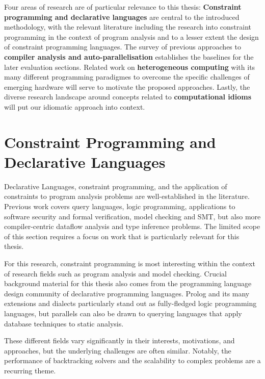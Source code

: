 
    Four areas of research are of particular relevance to this thesis:
    {\bf Constraint programming and declarative languages} are central to the
    introduced methodology, with the relevant literature including the research
    into constraint programming in the context of program analysis and to a
    lesser extent the design of constraint programming languages.
    The survey of previous approaches to
    {\bf compiler analysis and auto-parallelisation}
    establishes the baselines for the later evaluation sections.
    Related work on {\bf heterogeneous computing} with its many different
    programming paradigmes to overcome the specific challenges of emerging
    hardware will serve to motivate the proposed approaches.
    Lastly, the diverse research landscape around concepts related to
    {\bf computational idioms} will put our idiomatic approach into context.

\section{Constraint Programming and Declarative Languages}

    Declarative Languages, constraint programming, and the application of
    constraints to program analysis problems are well-established in the
    literature.
    Previous work covers query languages, logic programming, applications to
    software security and formal verification, model checking and SMT,
    but also more compiler-centric dataflow analysis and type inference
    problems.
    The limited scope of this section requires a focus on work that is
    particularly relevant for this thesis.

    For this research, constraint programming is most interesting within the
    context of research fields such as program analysis and model checking.
    Crucial background material for this thesis also comes from
    the programming language design community of declarative programming
    languages.
    Prolog and its many extensions and dialects particularly stand out as
    fully-fledged logic programming languages, but parallels can also be drawn
    to querying languages that apply database techniques to static analysis.

    These different fields vary significantly in their interests, motivations,
    and approaches, but the underlying challenges are often similar.
    Notably, the performance of backtracking solvers and the scalability to
    complex problems are a recurring theme.

